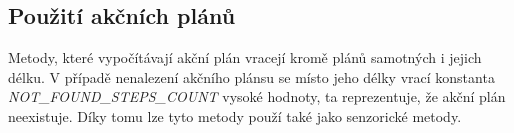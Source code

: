 \subsection{Použití akčních plánů}
Metody, které vypočítávají akční plán vracejí kromě plánů samotných i jejich délku. 
V případě nenalezení akčního plánsu se místo jeho délky vrací konstanta \emph{\uppercase{not\_found\_steps\_count}} vysoké hodnoty, ta reprezentuje, že akční plán neexistuje.
Díky tomu lze tyto metody použí také jako senzorické metody. 


